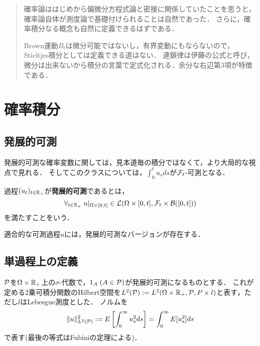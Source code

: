 \documentclass[uplatex,dvipdfmx]{jsreport}
\begin{document}
\begin{quotation}
    確率論ははじめから偏微分方程式論と密接に関係していたことを思うと，確率論自体が測度論で基礎付けられることは自然であった．
    さらに，確率積分なる概念も自然に定義できるはずである．

    Brown運動$B_t$は微分可能ではないし，有界変動にもならないので，Stieltjes積分としては定義できる道はない．
    連鎖律は伊藤の公式と呼び，微分は出来ないから積分の言葉で定式化される．余分な右辺第3項が特徴である．
\end{quotation}

\section{確率積分}

\subsection{発展的可測}

\begin{tcolorbox}[colframe=ForestGreen, colback=ForestGreen!10!white,breakable,colbacktitle=ForestGreen!40!white,coltitle=black,fonttitle=\bfseries\sffamily,
title=]
    発展的可測な確率変数に関しては，見本道毎の積分ではなくて，より大局的な視点で見れる．
    そしてこのクラスについては，$\int^t_0u_sds$が$\F_t$-可測となる．
\end{tcolorbox}

\begin{definition}
    過程$(u_t)_{t\in\R_+}$が\textbf{発展的可測}であるとは，
    \[\forall_{t\in\R_+}\;u|_{\Om\times[0,t]}\in\L(\Om\times[0,t],\F_t\times\B([0,t]))\]
    を満たすことをいう．
\end{definition}

\begin{lemma}[発展的可測性の十分条件]
    適合的な可測過程$u$には，発展的可測なバージョンが存在する．
\end{lemma}

\subsection{単過程上の定義}

\begin{notation}
    $\P$を$\Om\times\R_+$上の$\sigma$-代数で，$1_A\;(A\in\P)$が発展的可測になるものとする．
    これが定める2乗可積分関数のHilbert空間を$L^2(\P):=L^2(\Om\times\R_+,\P,P\times l)$と表す，ただし$l$はLebesgue測度とした．
    ノルムを
    \[\norm{u}^2_{L^2(\P)}:=E\Square{\int^\infty_{0}u_s^2ds}=\int^\infty_0E[u^2_s]ds\]
    で表す(最後の等式はFubiniの定理による)．
\end{notation}
\end{document}
